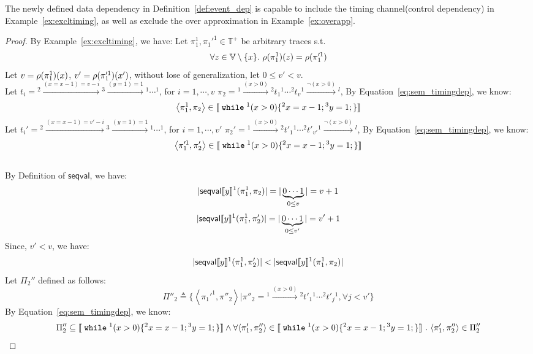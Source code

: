 \begin{example}
The newly defined data dependency in Definition~\ref{def:event_dep} is capable to include the timing channel(control dependency) in Example~\ref{ex:excltiming},
as well as exclude the over approximation in Example~\ref{ex:overapp}.
%
\begin{proof}
By Example~\ref{ex:excltiming}, we have:
%
%
Let $\pi_1^1, \pi_1'^1 \in \mathbb{T^{+}}$ be arbitrary traces s.t. 
%
$$\forall z \in \mathbb{V}\setminus \{x\}. ~ \rho(\pi_1^1)(z) = \rho(\pi_1'^1) $$ 
%
Let $v = \rho(\pi_1^1)(x) $, $v' = \rho(\pi_1'^1)(x')$, without lose of generalization, let $0 \leq v' < v$.
\\
Let 
$t_i = {}^2 \xrightarrow{(x = x - 1) = v - i } {}^3 \xrightarrow{(y = 1) = 1} {}^1 \cdots  {}^1$, for $i = 1, \cdots, v$
%
$\pi_2 = {}^1 \xrightarrow{(x > 0)} {}^2 t_1 {}^1 \cdots   {}^2 t_v {}^1 \xrightarrow{\neg(x > 0)} {}^l $,
%
 By Equation~\ref{eq:sem_timingdep}, we know:
\[
	\left< \pi_1^1, \pi_2 \right> \in \sem{\ewhile {}^1 (x > 0) \{{}^2 x = x - 1; {}^3 y = 1;\} }
\]
%
Let 
$t_i' = {}^2 \xrightarrow{(x = x - 1) = v' - i } {}^3 \xrightarrow{(y = 1) = 1} {}^1 \cdots  {}^1$, for $i = 1, \cdots, v'$
%
$\pi_2' = {}^1 \xrightarrow{(x > 0)} {}^2 t'_1 {}^1 \cdots  {}^2 t'_{v'} {}^1 \xrightarrow{\neg(x > 0)} {}^l $,
%
 By Equation~\ref{eq:sem_timingdep}, we know:
\[
	\left< \pi_1'^1, \pi'_2 \right> \in \sem{\ewhile {}^1 (x > 0) \{{}^2 x = x - 1; {}^3 y = 1;\} }
\]
%
\\
By Definition of $\mathsf{seqval}$, we have:
\[
	|\mathsf{seqval}\llbracket y \rrbracket{}^1(\pi_1^1, \pi_2 )| = |\underbrace{0 \cdots 1}_{0 \leq v}| = v + 1
\]
%
\[
	|\mathsf{seqval}\llbracket y \rrbracket{}^1(\pi_1^1, \pi_2' )| = |\underbrace{0 \cdots 1}_{0 \leq v'}| = v' + 1
\]
%
Since, $v' < v $, we have: 
\[
	|\mathsf{seqval}\llbracket y \rrbracket{}^1(\pi_1^1, \pi_2' )| < |\mathsf{seqval}\llbracket y \rrbracket{}^1(\pi_1^1, \pi_2 )|
\]
%
Let $\Pi_2''$ defined as follows:
\[
	\Pi''_2 \triangleq \{
	\left< \pi_1'^1, \pi''_2 \right> \vert
	\pi''_2 =  {}^1 \xrightarrow{(x > 0)} {}^2 t'_1 {}^1 \cdots  {}^2 t'_{j} {}^1, \forall j < v'\} 
\]
%
By Equation~\ref{eq:sem_timingdep}, we know:
%
\[
		\Pi''_2 \subseteq \sem{\ewhile {}^1 (x > 0) \{{}^2 x = x - 1; {}^3 y = 1;\} }
		\land
		\forall \left< \pi_1', \pi''_2 \right> \in \sem{\ewhile {}^1 (x > 0) \{{}^2 x = x - 1; {}^3 y = 1;\} } 
		\st \left< \pi_1', \pi''_2 \right> \in  \Pi''_2
\]
%


\end{proof}
\end{example}
